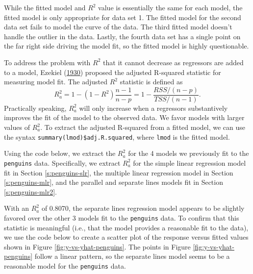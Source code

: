 \documentclass[
]{book}
\newenvironment{Shaded}{\begin{snugshade}}{\end{snugshade}}
\newcommand{\CommentTok}[1]{\textcolor[rgb]{0.56,0.35,0.01}{\textit{#1}}}
\newcommand{\DocumentationTok}[1]{\textcolor[rgb]{0.56,0.35,0.01}{\textbf{\textit{#1}}}}
\newcommand{\FunctionTok}[1]{\textcolor[rgb]{0.00,0.00,0.00}{#1}}
\newcommand{\NormalTok}[1]{#1}
\newcommand{\SpecialCharTok}[1]{\textcolor[rgb]{0.00,0.00,0.00}{#1}}
\theoremstyle{definition}
\theoremstyle{definition}
\theoremstyle{definition}
\theoremstyle{definition}
\theoremstyle{remark}
\begin{document}
While the fitted model and \(R^2\) value is essentially the same for each model, the fitted model is only appropriate for data set 1. The fitted model for the second data set fails to model the curve of the data. The third fitted model doesn't handle the outlier in the data. Lastly, the fourth data set has a single point on the far right side driving the model fit, so the fitted model is highly questionable.

To address the problem with \(R^2\) that it cannot decrease as regressors are added to a model, Ezekiel (\protect\hyperlink{ref-ezekiel1930methods}{1930}) proposed the adjusted R-squared statistic for measuring model fit. The adjusted \(R^2\) statistic is defined as
\[
R^2_a=1-(1-R^2)\frac{n-1}{n-p}=1-\frac{RSS/(n-p)}{TSS/(n-1)}.
\]
Practically speaking, \(R^2_a\) will only increase when a regressors substantively improves the fit of the model to the observed data. We favor models with larger values of \(R^2_a\). To extract the adjusted R-squared from a fitted model, we can use the syntax \texttt{summary(lmod)\$adj.R.squared}, where \texttt{lmod} is the fitted model.

Using the code below, we extract the \(R^2_a\) for the 4 models we previously fit to the \texttt{penguins} data. Specifically, we extract \(R_a^2\) for the simple linear regression model fit in Section \ref{s:penguins-slr}, the multiple linear regression model in Section \ref{s:penguins-mlr}, and the parallel and separate lines models fit in Section \ref{s:penguins-mlr2}.

\begin{Shaded}
\end{Shaded}

With an \(R_a^2\) of 0.8070, the separate lines regression model appears to be slightly favored over the other 3 models fit to the \texttt{penguins} data. To confirm that this statistic is meaningful (i.e., that the model provides a reasonable fit to the data), we use the code below to create a scatter plot of the response versus fitted values shown in Figure \ref{fig:y-vs-yhat-penguins}. The points in Figure \ref{fig:y-vs-yhat-penguins} follow a linear pattern, so the separate lines model seems to be a reasonable model for the \texttt{penguins} data.
\end{document}
